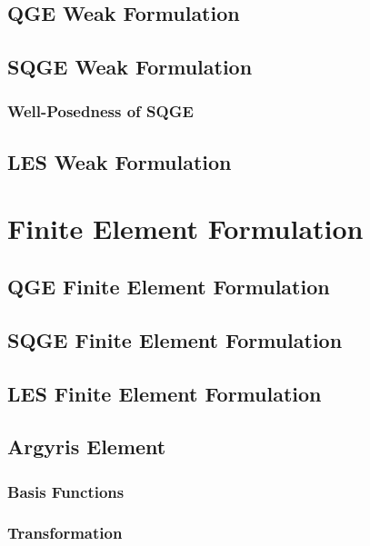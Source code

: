\documentclass[proposal]{VTthesis}
\begin{document}
    \section{QGE Weak Formulation} \label{sec:QGEWeak}
    
    \section{SQGE Weak Formulation} \label{sec:SQGEWeak}
    
      \subsection{Well-Posedness of SQGE}
      
    \section{LES Weak Formulation} \label{sec:LESWeak}
    

  \chapter{Finite Element Formulation} \label{ch:FEM}
    \section{QGE Finite Element Formulation} \label{sec:QGEFEM}
    
    \section{SQGE Finite Element Formulation} \label{sec:SQGEFEM}
    
    \section{LES Finite Element Formulation} \label{sec:LESFEF}
    
    \section{Argyris Element} \label{sec:Argyris}
    
      \subsection{Basis Functions} \label{sse:Basis}
      
      \subsection{Transformation} \label{sse:Trans}
      
\end{document}
